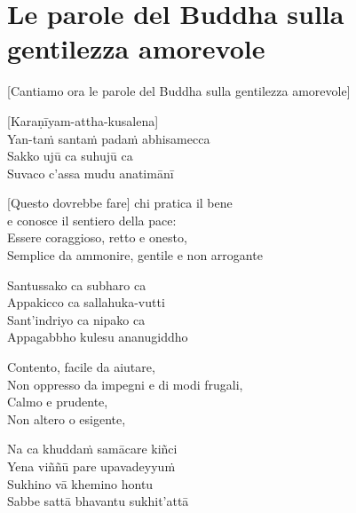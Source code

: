 \chapter[Mettā sutta]{Le parole del Buddha sulla gentilezza amorevole}


\delegateSetUseNext

\begin{leader}
\end{leader}

\begin{english}   
  [Cantiamo ora le parole del Buddha sulla gentilezza amorevole]
\end{english}



[Karaṇīyam-attha-kusalena]\\
Yan-taṁ santaṁ padaṁ abhisamecca\\
Sakko ujū ca suhujū ca\\
Suvaco c'assa mudu anatimānī

\begin{english}  
[Questo dovrebbe fare] chi pratica il bene\\ 
e conosce il sentiero della pace:\\
Essere coraggioso, retto e onesto,\\
Semplice da ammonire, gentile e non arrogante
\end{english}

Santussako ca subharo ca\\
Appakicco ca sallahuka-vutti\\
Sant'indriyo ca nipako ca\\
Appagabbho kulesu ananugiddho

\begin{english}
  Contento, facile da aiutare,\\ 
  Non oppresso da impegni e di modi frugali,\\
  Calmo e prudente,\\
  Non altero o esigente,  
\end{english}

  \clearpage

Na ca khuddaṁ samācare kiñci\\
Yena viññū pare upavadeyyuṁ\\
Sukhino vā khemino hontu\\
Sabbe sattā bhavantu sukhit'attā

